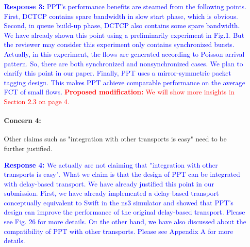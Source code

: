 \documentclass[12pt,one-column]{article}
\begin{document}
\noindent\textcolor{blue}{\textbf{Response 3:} 
PPT's performance benefits are steamed from the following points. First, DCTCP contains spare bandwidth in slow start phase, which is obvious.
Second, in queue build-up phase, DCTCP also contains some spare bandwidth. We have already shown this point using a preliminarily experiment in Fig.1. But the reviewer may consider this experiment only contains synchronized bursts. Actually, in this experiment, the flows are generated according to Poisson arrival  pattern. So, there are both synchronized and nonsynchronized cases. We plan to clarify this point in our paper.
Finally, PPT uses a mirror-symmetric packet tagging design. This makes PPT achieve comparable performance on the average FCT of small flows.
}
\noindent\textcolor{red}{\textbf{Proposed modification: }
We will show more insights in Section 2.3 on page 4.
}


{\it \paragraph{Concern 4:} Other claims such as "integration with other transports is easy" need to be further justified.}

\noindent\textcolor{blue}{\textbf{Response 4:} 
We actually are not claiming that "integration with other transports is easy".
What we claim is that the design of PPT can be integrated with delay-based transport.
We have already justified this point in our submission.
First, we have already implemented a delay-based transport conceptually equivalent to Swift in the ns3 simulator and showed that PPT's design can improve the performance of the original delay-based transport. Please see Fig. 26 for more details.
On the other hand, we have also discussed about the compatibility of PPT with other transports. Please see Appendix A for more details.
}
\end{document}
